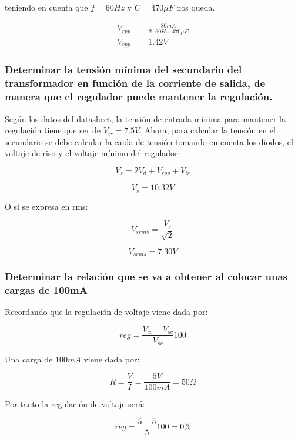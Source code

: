teniendo en cuenta que $f= 60Hz$ y $C= 470\mu F$  nos queda.

\begin{align*}
    V_{rpp} &= \frac{80m A}{2 \cdot 60Hz \cdot 470\mu F} \\
    V_{rpp} &= 1.42 V
\end{align*}

\subsubsection*{Determinar la tensión mínima del secundario del transformador en función de la corriente de salida, de manera que el regulador puede mantener la regulación.}

Según los datos del datasheet, la tensión de entrada mínima para mantener la regulación tiene que  ser de $ V_{ir} = 7.5V$. Ahora, para calcular la tensión en el secundario se debe calcular la caida de tensión tomando en cuenta los diodos, el voltaje de riso y el voltaje mínimo del regulador:

\begin{equation}
    V_{s} = 2 V_{d} + V_{rpp} + V_{ir}
    \label{eq:tension-min-secundario}
\end{equation}

$$ V_{s} = 10.32 V $$
 
O si se expresa en rms:

$$ V_{srms} = \frac{V_s}{\sqrt{2}} $$

$$ V_{srms} = 7.30 V $$

\subsubsection*{Determinar la relación que se va a obtener al colocar unas cargas de 100mA}

Recordando que la regulación de voltaje viene dada por:

\begin{equation}
    reg = \frac{V_{cc} - V_{sc}}{V_{sc}} 100 %
\end{equation}

Una carga de $100mA$ viene dada por:

$$ R = \frac{V}{I} = \frac{5V}{100mA} = 50 \Omega $$

Por tanto la regulación de voltaje será:

\begin{equation}
    reg = \frac{5 -5}{5} 100 = 0\%
\end{equation}

